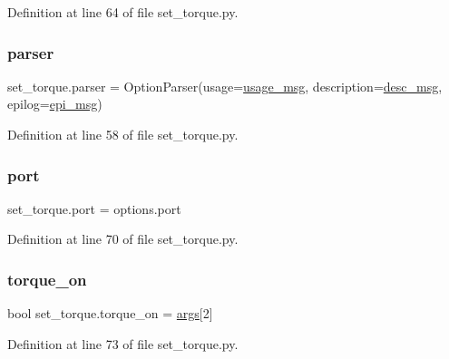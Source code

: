 Definition at line 64 of file set\+\_\+torque.\+py.

\mbox{\label{namespaceset__torque_a26f3ea70fdc5c5e10ff222e71ecbdcc7}} 
\subsubsection{\texorpdfstring{parser}{parser}}
{\footnotesize\ttfamily set\+\_\+torque.\+parser = Option\+Parser(usage=\hyperlink{namespaceset__torque_ac57a865b31cdc6e55fd5593f50488de6}{usage\+\_\+msg}, description=\hyperlink{namespaceset__torque_a6715e5416a3468b017ad49067131cf3f}{desc\+\_\+msg}, epilog=\hyperlink{namespaceset__torque_a34aa95210a205aecf7fe7bef0517fbd9}{epi\+\_\+msg})}



Definition at line 58 of file set\+\_\+torque.\+py.

\mbox{\label{namespaceset__torque_adbb76185d3bc8d9acc1d2d233efb3ef9}} 
\subsubsection{\texorpdfstring{port}{port}}
{\footnotesize\ttfamily set\+\_\+torque.\+port = options.\+port}



Definition at line 70 of file set\+\_\+torque.\+py.

\mbox{\label{namespaceset__torque_af05254d95cb5e25b3cd846f74ecbaac5}} 
\subsubsection{\texorpdfstring{torque\+\_\+on}{torque\_on}}
{\footnotesize\ttfamily bool set\+\_\+torque.\+torque\+\_\+on = \hyperlink{namespaceset__torque_a3021c459017eab874ec0a0da88be61f0}{args}\mbox{[}2\mbox{]}}



Definition at line 73 of file set\+\_\+torque.\+py.

